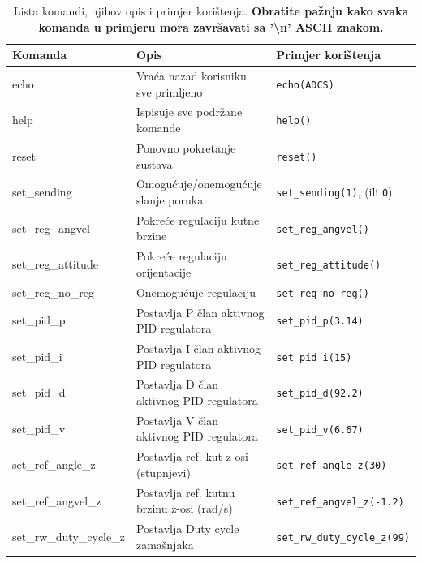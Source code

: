 \documentclass[times, utf8, diplomski, numeric]{templates/template}
\begin{document}
{{{{                \begin{table}[htb]
                \caption{Lista komandi, njihov opis i primjer korištenja. \textbf{Obratite pažnju kako svaka komanda u primjeru mora završavati sa '\textbackslash n' ASCII znakom.}}
                \label{tbl:lista_komandi}
                \centering
                \begin{tabular}{lll} 
                \toprule
                Komanda & Opis & Primjer korištenja \\ 
                \midrule
                echo                     & Vraća nazad korisniku sve primljeno          & \texttt{echo(ADCS)}                           \\
                help                     & Ispisuje sve podržane komande                & \texttt{help()}                               \\
                reset                    & Ponovno pokretanje sustava                   & \texttt{reset()}                              \\
                set\_sending             & Omogućuje/onemogućuje slanje poruka          & \texttt{set\_sending(1)}, (ili \texttt{0})    \\
                set\_reg\_angvel         & Pokreće regulaciju kutne brzine              & \texttt{set\_reg\_angvel()}                   \\
                set\_reg\_attitude       & Pokreće regulaciju orijentacije              & \texttt{set\_reg\_attitude()}                 \\
                set\_reg\_no\_reg        & Onemogućuje regulaciju                       & \texttt{set\_reg\_no\_reg()}                  \\
                set\_pid\_p              & Postavlja P član aktivnog PID regulatora     & \texttt{set\_pid\_p(3.14)}                    \\
                set\_pid\_i              & Postavlja I član aktivnog PID regulatora     & \texttt{set\_pid\_i(15)}                      \\
                set\_pid\_d              & Postavlja D član aktivnog PID regulatora     & \texttt{set\_pid\_d(92.2)}                    \\
                set\_pid\_v              & Postavlja V član aktivnog PID regulatora     & \texttt{set\_pid\_v(6.67)}                   \\
                set\_ref\_angle\_z       & Postavlja ref. kut z-osi (stupnjevi)         & \texttt{set\_ref\_angle\_z(30)}               \\
                set\_ref\_angvel\_z      & Postavlja ref. kutnu brzinu z-osi (rad/s)    & \texttt{set\_ref\_angvel\_z(-1.2)}            \\
                set\_rw\_duty\_cycle\_z  & Postavlja Duty cycle zamašnjaka              & \texttt{set\_rw\_duty\_cycle\_z(99)}          \\
                \bottomrule
                \end{tabular}
                \end{table}

}}}}
\end{document}
